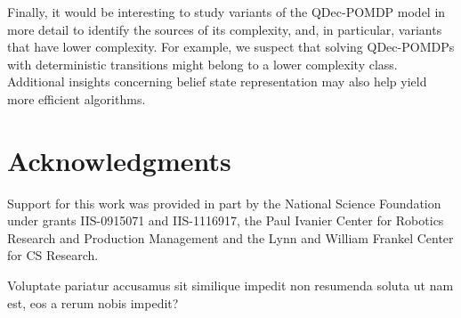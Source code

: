 \documentclass[letterpaper]{article}
\theoremstyle{definition}
\begin{document}
Finally, it would be interesting to study variants of the QDec-POMDP model in more detail to identify the sources of its complexity, and, in particular, variants that have lower complexity. For example, we suspect that solving QDec-POMDPs with deterministic transitions might belong to a lower complexity class. Additional insights concerning belief state representation may also help yield more efficient algorithms.

\section{Acknowledgments}

Support for this work was provided in part by the National Science Foundation under grants IIS-0915071 and IIS-1116917, the Paul Ivanier Center for Robotics Research and Production Management and the Lynn and William Frankel Center for CS Research.





\newpage


Voluptate pariatur accusamus sit similique impedit non resumenda soluta ut nam est, eos a rerum nobis impedit?\clearpage

\end{document}
